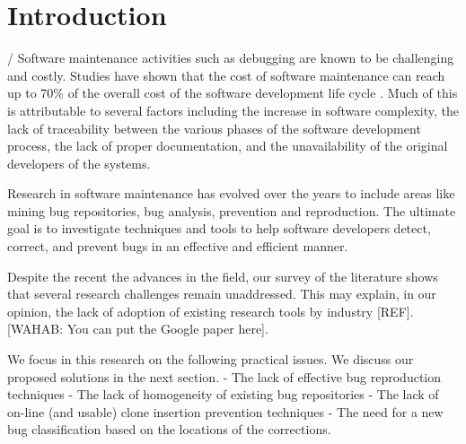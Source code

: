 
\setcounter{page}{1}

\chapter{Introduction}

/%
Software maintenance activities such as debugging are known to be challenging and costly\cite{Pressman2005}. Studies have shown that the cost of software maintenance can reach up to 70\% of the overall cost of the software development life cycle \cite{HealthSocial2002}. Much of this is attributable to several factors including the increase in software complexity, the lack of traceability between the various phases of the software development process, the lack of proper documentation,  and the unavailability of the original developers of the systems. 

Research in software maintenance has evolved over the years to include areas like mining bug repositories, bug analysis, prevention and reproduction. The ultimate goal is to investigate techniques and tools to help software developers detect, correct, and prevent bugs in an effective and efficient manner. 

Despite the recent the advances in the field, our survey of the literature shows that several research challenges remain unaddressed. This may explain, in our opinion, the lack of adoption of existing research tools by industry [REF]. [WAHAB: You can put the Google paper here]. 

We focus in this research on the following practical issues. We discuss our proposed solutions in the next section.
- The lack of effective bug reproduction techniques
- The lack of homogeneity of existing bug repositories
- The lack of on-line (and usable) clone insertion prevention techniques
- The need for a new bug classification based on the locations of the corrections.


